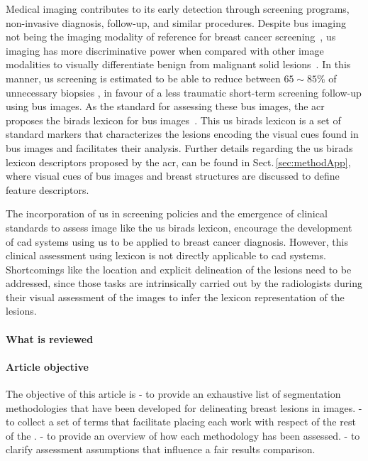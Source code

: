 Medical imaging contributes to its early detection through screening programs, non-invasive diagnosis, follow-up, and similar procedures.
Despite \ac{bus} imaging not being the imaging modality of reference for breast cancer screening~\cite{smith2003american}, \ac{us} imaging has more discriminative power when compared with other image modalities to visually differentiate benign from malignant solid lesions~\cite{Stavros:1995p12392}.
In this manner, \ac{us} screening is estimated to be able to reduce
between $65\sim85\%$ of unnecessary biopsies%
, in favour of a less traumatic short-term screening follow-up using \ac{bus} images.
As the standard for assessing these \ac{bus} images, the \ac{acr} proposes the \ac{birads} lexicon for \ac{bus} images~\cite{biradsus}.
This \ac{us} \ac{birads} lexicon is a set of standard markers that characterizes the lesions encoding the visual cues found in \ac{bus} images and facilitates their analysis.
Further details regarding the \ac{us} \ac{birads} lexicon descriptors proposed by the \ac{acr}, can be found in Sect.\,\ref{sec:methodApp}, where visual cues of \ac{bus} images and breast structures are discussed to define feature descriptors.

The incorporation of \ac{us} in screening policies and the emergence of clinical standards to assess image like the \ac{us} \ac{birads} lexicon, encourage the development of \ac{cad} systems using \ac{us} to be applied to breast cancer diagnosis.
However, this clinical assessment using lexicon is not directly applicable to \ac{cad} systems.
Shortcomings like the location and explicit delineation of the lesions need to be addressed, since those tasks are intrinsically carried out by the radiologists during their visual assessment of the images to infer the lexicon representation of the lesions.

\paragraph{What is reviewed}
\label{sec:intro:what_is_reviewed}

\paragraph{Article objective}
\label{sec:intro:article_objective}

The objective of this article is
- to provide an exhaustive list of segmentation methodologies that have been developed for delineating breast lesions in \us images.
- to collect a set of terms that facilitate placing each work with respect of the rest of the \stateArt.
- to provide an overview of how each methodology has been assessed.
- to clarify assessment assumptions that influence a fair results comparison.

